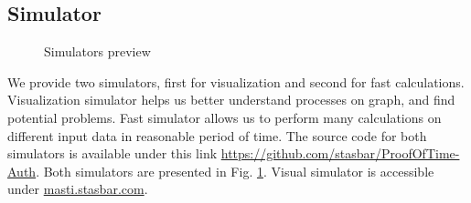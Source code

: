 \documentclass[nostrict]{szablonPG}
\begin{document}
\subsection{Simulator}
\begin{figure}[h!]
 \hfill 	
\caption{Simulators preview}
\label{fig:simulators}
\end{figure}
We provide two simulators, first for visualization and second for fast calculations. Visualization simulator helps us better understand processes on graph, and find potential problems. Fast simulator allows us to perform many calculations on different input data in reasonable period of time. The source code for both simulators is available under this link \url{https://github.com/stasbar/ProofOfTime-Auth}. Both simulators are presented in Fig. \ref{fig:simulators}. Visual simulator is accessible under \url{masti.stasbar.com}.
\end{document}
